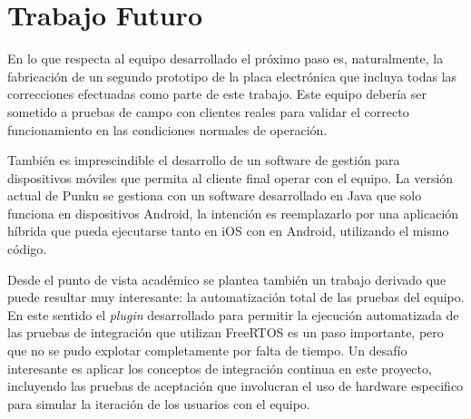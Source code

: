 \section{Trabajo Futuro}

En lo que respecta al equipo desarrollado el próximo paso es, naturalmente, la fabricación de un segundo prototipo de la placa electrónica que incluya todas las correcciones efectuadas como parte de este trabajo. Este equipo debería ser sometido a pruebas de campo con clientes reales para validar el correcto funcionamiento en las condiciones normales de operación.

También es imprescindible el desarrollo de un software de gestión para dispositivos móviles que permita al cliente final operar con el equipo. La versión actual de Punku se gestiona con un software desarrollado en Java que solo funciona en dispositivos Android, la intención es reemplazarlo por una aplicación híbrida que pueda ejecutarse tanto en iOS con en Android, utilizando el mismo código. 

Desde el punto de vista académico se plantea también un trabajo derivado que puede resultar muy interesante: la automatización total de las pruebas del equipo. En este sentido el \emph{plugin} desarrollado para permitir la ejecución automatizada de las pruebas de integración que utilizan FreeRTOS es un paso importante, pero que no se pudo explotar completamente por falta de tiempo. Un desafío interesante es aplicar los conceptos de integración continua en este proyecto, incluyendo las pruebas de aceptación que involucran el uso de hardware especifico para simular la iteración de los usuarios con el equipo.
